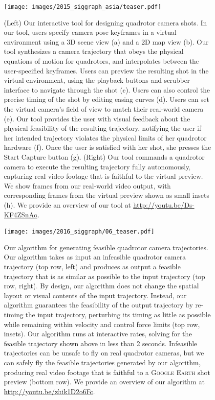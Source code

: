 \begin{figure}[t!]
\centering
\texttt{[image: images/2015\_siggraph\_asia/teaser.pdf]}
\caption{
(Left) Our interactive tool for designing quadrotor camera shots.
In our tool, users specify camera pose keyframes in a virtual environment using a 3D scene view (a) and a 2D map view (b).
Our tool synthesizes a camera trajectory that obeys the physical equations of motion for quadrotors, and interpolates between the user-specified keyframes.
Users can preview the resulting shot in the virtual environment, using the playback buttons and scrubber interface to navigate through the shot (c).
Users can also control the precise timing of the shot by editing easing curves (d).
Users can set the virtual camera's field of view to match their real-world camera (e).
Our tool provides the user with visual feedback about the physical feasibility of the resulting trajectory, notifying the user if her intended trajectory violates the physical limits of her quadrotor hardware (f).
Once the user is satisfied with her shot, she presses the Start Capture button (g).
(Right) Our tool commands a quadrotor camera to execute the resulting trajectory fully autonomously, capturing real video footage that is faithful to the virtual preview.
We show frames from our real-world video output, with corresponding frames from the virtual preview shown as small insets (h).
We provide an overview of our tool at \url{http://youtu.be/Ds-KF4ZSnAo}.
}
\label{fig:ch1:teaser_ch2}
\end{figure}

\begin{figure}[t!]
\centering
\texttt{[image: images/2016\_siggraph/06\_teaser.pdf]}
\caption{
Our algorithm for generating feasible quadrotor camera trajectories.
Our algorithm takes as input an infeasible quadrotor camera trajectory (top row, left) and produces as output a feasible trajectory that is as similar as possible to the input trajectory (top row, right).
By design, our algorithm does not change the spatial layout or  visual contents of the input trajectory.
Instead, our algorithm guarantees the feasibility of the output trajectory by re-timing the input trajectory, perturbing its timing as little as possible while remaining within velocity and control force limits (top row, insets).
Our algorithm runs at interactive rates, solving for the feasible trajectory shown above in less than 2 seconds.
Infeasible trajectories can be unsafe to fly on real quadrotor cameras, but we can safely fly the feasible trajectories generated by our algorithm, producing real video footage that is faithful to a \textsc{Google Earth} shot preview (bottom row).
We provide an overview of our algorithm at \url{http://youtu.be/zhik1D2o6Fc}.
}
\label{fig:ch1:teaser_ch3}
\end{figure}


